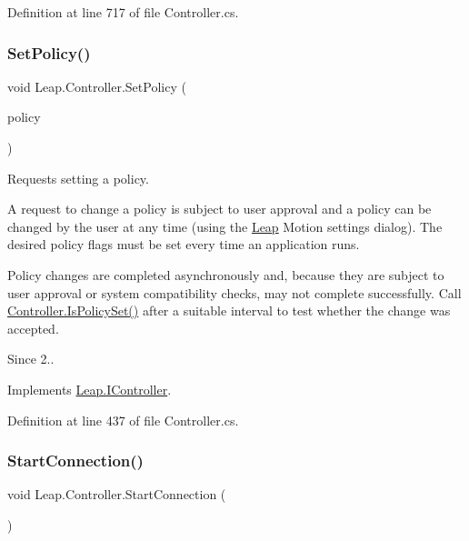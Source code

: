 Definition at line 717 of file Controller.\+cs.

\mbox{\label{class_leap_1_1_controller_a7e862547a7ea735203220e43c0e04a85}} 
\subsubsection{\texorpdfstring{SetPolicy()}{SetPolicy()}}
{\footnotesize\ttfamily void Leap.\+Controller.\+Set\+Policy (\begin{DoxyParamCaption}\item[{\mbox{\hyperlink{class_leap_1_1_controller_a0bdb49fa94aa2da8b098c1ac296528d6}{Policy\+Flag}}}]{policy }\end{DoxyParamCaption})}



Requests setting a policy. 

A request to change a policy is subject to user approval and a policy can be changed by the user at any time (using the \mbox{\hyperlink{namespace_leap}{Leap}} Motion settings dialog). The desired policy flags must be set every time an application runs.

Policy changes are completed asynchronously and, because they are subject to user approval or system compatibility checks, may not complete successfully. Call \mbox{\hyperlink{class_leap_1_1_controller_af0f85f9c36a57143107952afc26ec5d4}{Controller.\+Is\+Policy\+Set()}} after a suitable interval to test whether the change was accepted. \begin{DoxySince}{Since}
2.. 
\end{DoxySince}


Implements \mbox{\hyperlink{interface_leap_1_1_i_controller_a12a90db07fb494e152cc937569ec77f0}{Leap.\+I\+Controller}}.



Definition at line 437 of file Controller.\+cs.

\mbox{\label{class_leap_1_1_controller_a3e1e2694a23c62c79f9592217529e860}} 
\subsubsection{\texorpdfstring{StartConnection()}{StartConnection()}}
{\footnotesize\ttfamily void Leap.\+Controller.\+Start\+Connection (\begin{DoxyParamCaption}{ }\end{DoxyParamCaption})}



